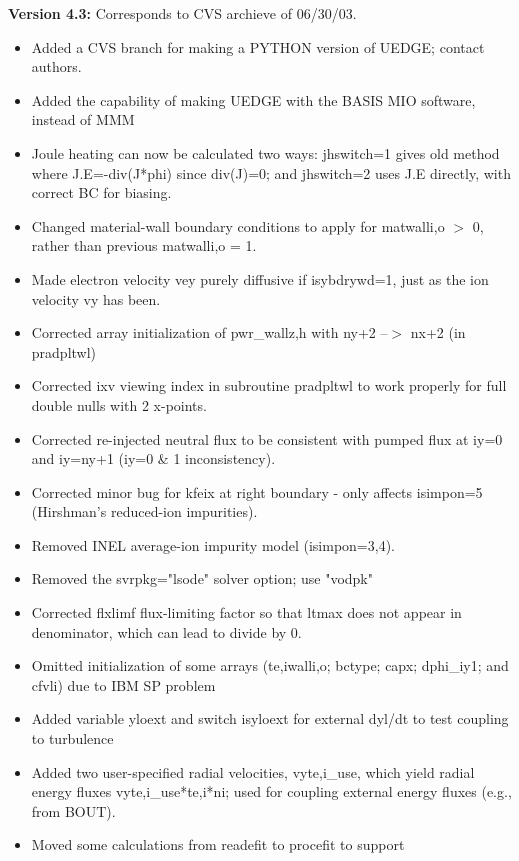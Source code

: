 \documentclass [12pt]{article}
\begin{document}
\noindent\textbf{Version 4.3:} Corresponds to CVS archieve of 06/30/03.
\begin{itemize}
  \item Added a CVS branch for making a PYTHON version of UEDGE;
          contact authors.
  \item Added the capability of making UEDGE with the BASIS MIO
          software, instead of MMM
  \item Joule heating can now be calculated two ways: jhswitch=1
          gives old method where J.E=-div(J*phi) since div(J)=0; and
          jhswitch=2 uses J.E directly, with correct BC for biasing.
  \item Changed material-wall boundary conditions to apply for
          matwalli,o $>$ 0, rather than previous matwalli,o = 1.
  \item Made electron velocity vey purely diffusive if isybdrywd=1,
          just as the ion velocity vy has been.
  \item Corrected array initialization of pwr\_wallz,h with
          ny+2 --$>$ nx+2 (in pradpltwl)
  \item Corrected ixv viewing index in subroutine pradpltwl to work
          properly for full double nulls with 2 x-points.
  \item Corrected re-injected neutral flux to be consistent with
          pumped flux at iy=0 and iy=ny+1 (iy=0 \& 1 inconsistency).
  \item Corrected minor bug for kfeix at right boundary - only
          affects isimpon=5 (Hirshman's reduced-ion impurities).
  \item Removed INEL average-ion impurity model (isimpon=3,4).
  \item Removed the svrpkg="lsode" solver option; use "vodpk"
  \item Corrected flxlimf flux-limiting factor so that ltmax does
          not appear in denominator, which can lead to divide by 0.
  \item Omitted initialization of some arrays (te,iwalli,o; bctype;
          capx; dphi\_iy1; and cfvli) due to IBM SP problem
  \item Added variable yloext and switch isyloext for external dyl/dt
          to test coupling to turbulence
  \item Added two user-specified radial velocities, vyte,i\_use, 
          which yield radial energy fluxes vyte,i\_use*te,i*ni; used
          for coupling external energy fluxes (e.g., from BOUT).
  \item Moved some calculations from readefit to procefit to support

\end{itemize}
\end{document}
